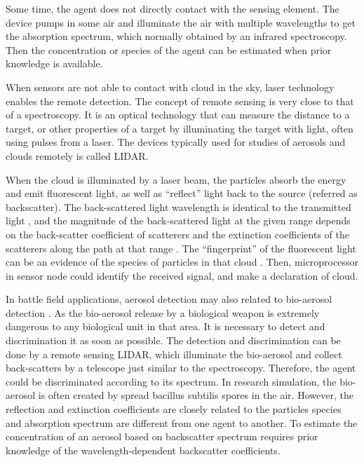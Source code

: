 Some time, the agent does not directly contact with the sensing element.
The device pumps in some air and illuminate the air with multiple
wavelengths to get the absorption spectrum, which normally obtained
by an infrared spectroscopy. Then the concentration or species of
the agent can be estimated when prior knowledge is available. 

When sensors are not able to contact with cloud in the sky, laser
technology enables the remote detection. The concept of remote sensing
is very close to that of a spectroscopy. It is an optical technology
that can measure the distance to a target, or other properties of
a target by illuminating the target with light, often using pulses
from a laser. The devices typically used for studies of aerosols and
clouds remotely is called LIDAR. 

When the cloud is illuminated by a laser beam, the particles absorb
the energy and emit fluorescent light, as well as ``reflect'' light
back to the source (referred as backscatter). The back-scattered light
wavelength is identical to the transmitted light \cite{Lidar.Wiki.2011},
and the magnitude of the back-scattered light at the given range depends
on the back-scatter coefficient of scatterers and the extinction coefficients
of the scatterers along the path at that range \cite{P.M.Hamilton1969}.
The ``fingerprint'' of the fluorescent light can be an evidence
of the species of particles in that cloud \cite{Simard2004}. Then,
microprocessor in sensor node could identify the received signal,
and make a declaration of cloud. 

In battle field applications, aerosol detection may also related to
bio-aerosol detection \cite{Bufton2007}. As the bio-aerosol release
by a biological weapon is extremely dangerous to any biological unit
in that area. It is necessary to detect and discrimination it as soon
as possible. The detection and discrimination can be done by a remote
sensing LIDAR, which illuminate the bio-aerosol  and collect back-scatters
by a telescope just similar to the spectroscopy. Therefore, the agent
could be discriminated according to its spectrum. In research simulation,
the bio-aerosol is often created by spread bacillus subtilis spores
in the air. However, the reflection and extinction coefficients are
closely related to the particles species and absorption spectrum are
different from one agent to another. To estimate the concentration
of an aerosol based on backscatter spectrum requires prior knowledge
of the wavelength-dependent backscatter coefficients. 

